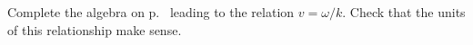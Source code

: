 Complete the algebra on p.~\pageref{phase-vel-omega-k} leading to the
relation $v=\omega/k$. Check that the units of this relationship make sense.


